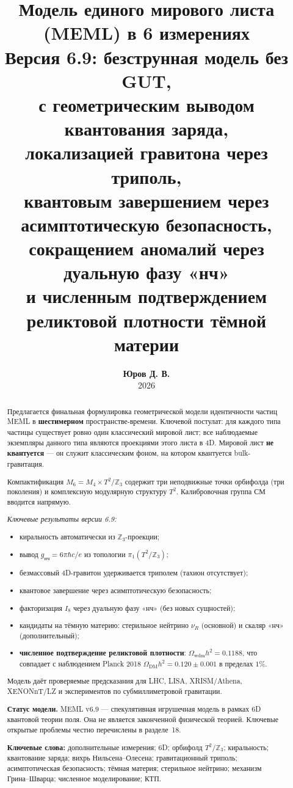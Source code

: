 \documentclass[11pt,letterpaper]{article}
\title{\textbf{Модель единого мирового листа (MEML) в 6 измерениях}\\
\large Версия 6.9: безструнная модель без GUT,\\
с геометрическим выводом квантования заряда,\\
локализацией гравитона через триполь,\\
квантовым завершением через асимптотическую безопасность,\\
сокращением аномалий через дуальную фазу «нч»\\
и численным подтверждением реликтовой плотности тёмной материи}
\author{\textbf{Юров Д. В.} \\ 2026}
\date{}
\begin{document}
\maketitle

\begin{abstract}
Предлагается финальная формулировка геометрической модели идентичности частиц MEML в \textbf{шестимерном} пространстве-времени. Ключевой постулат: для каждого типа частицы существует ровно один классический мировой лист; все наблюдаемые экземпляры данного типа являются проекциями этого листа в 4D. Мировой лист \textbf{не квантуется} --- он служит классическим фоном, на котором квантуется bulk-гравитация.

Компактификация $M_6 = M_4 \times T^2/\mathbb{Z}_3$ содержит три неподвижные точки орбифолда (три поколения) и комплексную модулярную структуру $T^2$. Калибровочная группа СМ вводится напрямую.

\emph{Ключевые результаты версии 6.9:}
\begin{itemize}
\item киральность автоматически из $\mathbb{Z}_3$-проекции;
\item вывод $g_{\text{нч}} = 6\pi\hbar c/e$ из топологии $\pi_1(T^2/\mathbb{Z}_3)$;
\item безмассовый 4D-гравитон удерживается триполем (тахион отсутствует);
\item квантовое завершение через асимптотическую безопасность;
\item факторизация $I_8$ через дуальную фазу «нч» (без новых сущностей);
\item кандидаты на тёмную материю: стерильное нейтрино $\nu_R$ (основной) и скаляр «нч» (дополнительный);
\item \textbf{численное подтверждение реликтовой плотности}: $\Omega_{\text{wdm}} h^2 = 0.1188$, что совпадает с наблюдением Planck 2018 $\Omega_{\text{DM}} h^2 = 0.120 \pm 0.001$ в пределах $1\%$.
\end{itemize}

Модель даёт проверяемые предсказания для LHC, LISA, XRISM/Athena, XENONnT/LZ и экспериментов по субмиллиметровой гравитации.

\medskip
\noindent\textbf{Статус модели.} MEML v6.9 --- спекулятивная игрушечная модель в рамках 6D квантовой теории поля. Она не является законченной физической теорией. Ключевые открытые проблемы честно перечислены в разделе~18.

\medskip
\noindent\textbf{Ключевые слова:} дополнительные измерения; 6D; орбифолд $T^2/\mathbb{Z}_3$; киральность; квантование заряда; вихрь Нильсена--Олесена; гравитационный триполь; асимптотическая безопасность; тёмная материя; стерильное нейтрино; механизм Грина--Шварца; численное моделирование; КТП.
\end{abstract}
\end{document}
